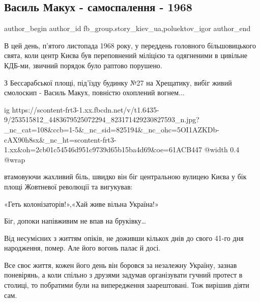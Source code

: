  
 
 
 
 
 
\subsection{Василь Макух - самоспалення - 1968}
\label{sec:05_11_2021.fb.fb_group.story_kiev_ua.3.makuh_1968_sozzhenie}
 
\ifcmt
 author_begin
   author_id fb_group.story_kiev_ua,poluektov_igor
 author_end
\fi

В цей день, п’ятого листопада 1968 року, у переддень головного більшовицького
свята, коли центр Києва був переповнений міліцією та одягненими в цивільне
КДБ-ми, звичний порядок було раптово порушено.

З Бессарабської площі, під’їзду будинку №27 на Хрещатику, вибіг живий смолоскип
- Василь Макух, повністю охоплений вогнем...

\ifcmt
  ig https://scontent-frt3-1.xx.fbcdn.net/v/t1.6435-9/253515812_4483679525072294_823171429230827593_n.jpg?_nc_cat=108&ccb=1-5&_nc_sid=825194&_nc_ohc=5OI1AZKDb-cAX90h8sx&_nc_ht=scontent-frt3-1.xx&oh=2cb01c54546d951c9739d65b15ba4d69&oe=61ACB447
  @width 0.4
  @wrap 
\fi

втамовуючи жахливий біль, швидко він біг центральною вулицею Києва у бік площі
Жовтневої революції та вигукував: 

«Геть колонізаторів!»,«Хай живе вільна Україна!»

Біг, допоки напівживим не впав на бруківку…

Від несумісних з життям опіків, не доживши кількох днів до свого 41-го дня
народження, помер. Але його вогонь палає й досі. 

Все своє життя, кожен його день він боровся за незалежну Україну, зазнав
поневірянь, а коли спільно з друзями задумав організувати гучний протест в
столиці, то побратими були на випередження заарештовані. Тож вирішив діяти сам.

